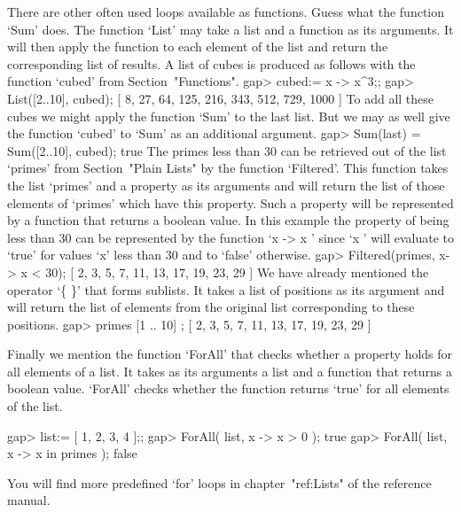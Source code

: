 There are other often used loops available as functions.   Guess what the
function `Sum' does.  The function `List' may  take a list and a function
as its arguments.  It will then apply the function to each element of the
list  and return  the corresponding list of results.   A list of cubes is
produced as follows with the function `cubed' from Section~"Functions".
\beginexample
gap> cubed:= x -> x^3;;
gap> List([2..10], cubed);
[ 8, 27, 64, 125, 216, 343, 512, 729, 1000 ]
\endexample
To add all these cubes  we might apply the  function  `Sum' to  the  last
list.  But we may  as well  give the  function  `cubed' to  `Sum'  as  an
additional argument.
\beginexample
gap> Sum(last) = Sum([2..10], cubed);
true
\endexample
The  primes less than 30 can  be retrieved out  of the list `primes' from
Section~"Plain Lists" by the function `Filtered'. This function takes the
list `primes' and a property as its arguments and will return the list of
those elements of `primes' which have this property. Such a property will
be represented  by  a function  that  returns  a boolean  value. In  this
example the property  of  being less than  30 can be represented  by  the
function `x  -> x ' since `x ' will evaluate to `true'  for
values `x' less than 30 and to `false' otherwise.
\beginexample
gap> Filtered(primes, x-> x < 30);
[ 2, 3, 5, 7, 11, 13, 17, 19, 23, 29 ]
\endexample
We have already  mentioned the operator `\{  \}' that  forms sublists. It
takes a  list of positions  as its argument  and will return  the list of
elements from the original list corresponding to these positions.
\beginexample
gap> primes{ [1 .. 10] };
[ 2, 3, 5, 7, 11, 13, 17, 19, 23, 29 ]
\endexample

Finally we mention the function `ForAll' that checks whether a property
holds for all elements of a list. It takes as its arguments  a list and a 
function that returns a boolean value. `ForAll' checks whether the
function returns `true' for all elements of the list.

\beginexample
gap> list:= [ 1, 2, 3, 4 ];;
gap> ForAll( list, x -> x > 0 );
true
gap> ForAll( list, x -> x in primes );
false
\endexample
 
You will find more predefined `for' loops in chapter~"ref:Lists" of the
reference manual.



